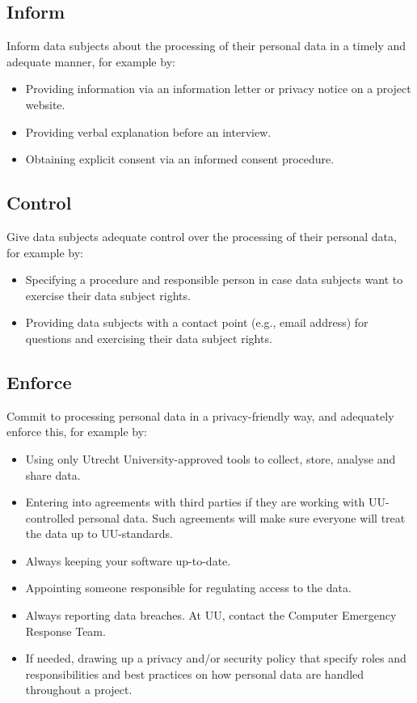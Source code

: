 \documentclass[
]{book}
\providecommand{\tightlist}{%
  \setlength{\itemsep}{0pt}\setlength{\parskip}{0pt}}
\begin{document}
\hypertarget{inform}{%
\subsection{Inform}\label{inform}}

Inform data subjects about the processing of their personal data in a timely
and adequate manner, for example by:

\begin{itemize}
\tightlist
\item
  Providing information via an
  information letter or privacy notice on a project
  website.
\item
  Providing verbal explanation before an interview.
\item
  Obtaining explicit consent via an informed consent procedure.
\end{itemize}

\hypertarget{control}{%
\subsection{Control}\label{control}}

Give data subjects adequate control over the processing of their personal data,
for example by:

\begin{itemize}
\tightlist
\item
  Specifying a procedure and responsible person in case data subjects want to
  exercise their data subject rights.
\item
  Providing data subjects with a contact point (e.g., email address) for
  questions and exercising their data subject rights.
\end{itemize}

\hypertarget{enforce}{%
\subsection{Enforce}\label{enforce}}

Commit to processing personal data in a privacy-friendly way, and adequately
enforce this, for example by:

\begin{itemize}
\tightlist
\item
  Using only
  Utrecht University-approved tools
  to collect, store, analyse and share data.
\item
  Entering into agreements with third parties if they
  are working with UU-controlled personal data. Such agreements will make sure
  everyone will treat the data up to UU-standards.
\item
  Always keeping your software up-to-date.
\item
  Appointing someone responsible for regulating access to the data.
\item
  Always reporting
  data breaches.
  At UU, contact the Computer Emergency Response Team.
\item
  If needed, drawing up a privacy and/or security policy that specify roles and
  responsibilities and best practices on how personal data are handled throughout
  a project.
\end{itemize}
\end{document}
